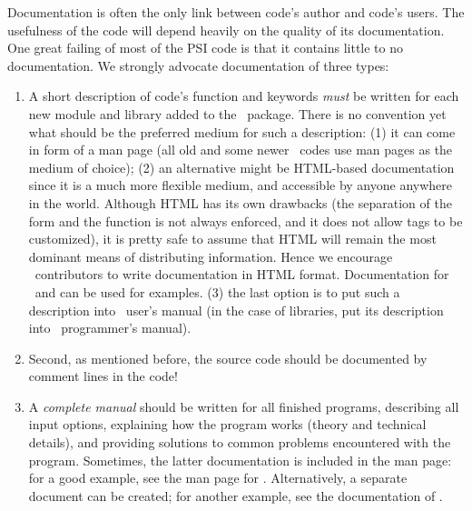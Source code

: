 Documentation is often the only link between code's author and
code's users. The usefulness of the code will depend heavily
on the quality of its documentation.
One great failing of most of the PSI code is that it contains little
to no documentation.  We strongly advocate documentation of three types:
\begin{enumerate}
\item A short description of code's function and keywords {\em must} be written
for each new module and library added to the \PSIthree\ package.
There is no convention yet what should be the preferred medium for such a description:
(1) it can come in form of a man page (all old and some newer \PSIthree\ codes
use man pages as the medium of choice);
(2) an alternative might be HTML-based documentation since it is a much more
flexible medium, and
accessible by anyone anywhere in the world. Although HTML has its own drawbacks
(the separation of the form and the function is not always enforced, and
it does not allow tags to be customized), it is pretty safe to assume that
HTML will remain the most dominant means of distributing information.
Hence we encourage \PSIthree\ contributors to write documentation
in HTML format. Documentation for \PSIcints\ and 
can be used for examples.
(3) the last option is to put such a description into \PSIthree\ user's manual (in
the case of libraries, put its description into \PSIthree\ programmer's manual).
\item Second, as mentioned before, the source code should be
documented by comment lines in the code!
\item A {\em complete manual} should be written for all finished programs,
describing all input options, explaining how the program works (theory and 
technical details), and providing solutions to common problems encountered
with the program.  Sometimes, the latter documentation is included in the
man page: for a good example, see the man page for .  
Alternatively, a separate document can be created; for another example,
see the documentation of .
\end{enumerate}
